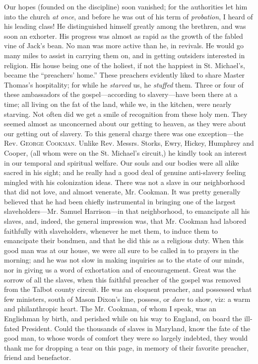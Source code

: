 Our hopes (founded on the discipline) soon vanished; for the authorities
let him into the church \emph{at once}, and before he was out of his
term of \emph{probation}, I heard of his leading class! He distinguished
himself greatly among the brethren, and was soon an exhorter. His
progress was almost as rapid as the growth of the fabled vine of Jack's
bean. No man was more active than he, in revivals. He would go many
miles to assist in carrying them on, and in getting outsiders interested
in religion. His house being one of the holiest, if not the happiest in
St. Michael's, became the ``preachers' home.'' These preachers evidently
liked to share Master Thomas's hospitality; for while he \emph{starved}
us, he \emph{stuffed} them. Three or four of these
{\protect\hypertarget{198}{}{}}ambassadors of the gospel---according to
slavery---have been there at a time; all living on the fat of the land,
while we, in the kitchen, were nearly starving. Not often did we get a
smile of recognition from these holy men. They seemed almost as
unconcerned about our getting to heaven, as they were about our getting
out of slavery. To this general charge there was one exception---the
Rev. \textsc{George Cookman}. Unlike Rev. Messrs. Storks, Ewry, Hickey,
Humphrey and Cooper, (all whom were on the St. Michael's circuit,) he
kindly took an interest in our temporal and spiritual welfare. Our souls
and our bodies were all alike sacred in his sight; and he really had a
good deal of genuine anti-slavery feeling mingled with his colonization
ideas. There was not a slave in our neighborhood that did not love, and
almost venerate, Mr. Cookman. It was pretty generally believed that he
had been chiefly instrumental in bringing one of the largest
slaveholders---Mr. Samuel Harrison---in that neighborhood, to emancipate
all his slaves, and, indeed, the general impression was, that Mr.
Cookman had labored faithfully with slaveholders, whenever he met them,
to induce them to emancipate their bondmen, and that he did this as a
religious duty. When this good man was at our house, we were all sure to
be called in to prayers in the morning; and he was not slow in making
inquiries as to the state of our minds, nor in giving us a word of
exhortation and of encouragement. Great was the sorrow of all the
slaves, when this faithful preacher of the gospel was removed from the
Talbot county circuit. He was an eloquent preacher, and possessed what
few ministers, {\protect\hypertarget{199}{}{}}south of Mason Dixon's
line, possess, or \emph{dare} to show, viz: a warm and philanthropic
heart. The Mr. Cookman, of whom I speak, was an Englishman by birth, and
perished while on his way to England, on board the ill-fated President.
Could the thousands of slaves in Maryland, know the fate of the good
man, to whose words of comfort they were so largely indebted, they would
thank me for dropping a tear on this page, in memory of their favorite
preacher, friend and benefactor.

